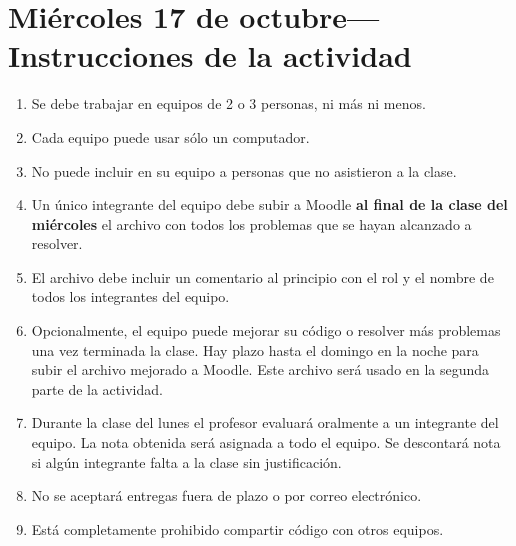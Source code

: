 \documentclass[12pt,spanish]{article}
\begin{document}
  \thispagestyle{empty}
  \pagestyle{empty}
  \section*{Miércoles 17 de octubre---Instrucciones de la actividad}

  \begin{enumerate}[leftmargin=0pt]

    \item
      Se debe trabajar en equipos de 2 o 3 personas,
      ni más ni menos.

    \item
      Cada equipo puede usar sólo un computador.

    \item
      No puede incluir en su equipo
      a personas que no asistieron a la clase.

    \item
      Un único integrante del equipo debe subir a Moodle
      \textbf{al final de la clase del miércoles}
      el archivo con todos los problemas que se hayan alcanzado a resolver.

    \item
      El archivo debe incluir un comentario al principio
      con el rol y el nombre de todos los integrantes del equipo.

    \item
      Opcionalmente,
      el equipo puede mejorar su código o resolver más problemas
      una vez terminada la clase.
      Hay plazo hasta el domingo en la noche
      para subir el archivo mejorado a Moodle.
      Este archivo será usado en la segunda parte de la actividad.

    \item
      Durante la clase del lunes
      el profesor evaluará oralmente a un integrante del equipo.
      La nota obtenida será asignada a todo el equipo.
      Se descontará nota si algún integrante
      falta a la clase sin justificación.

    \item
      No se aceptará entregas fuera de plazo o por correo electrónico.

    \item
      Está completamente prohibido compartir código con otros equipos.

  \end{enumerate}
\end{document}
